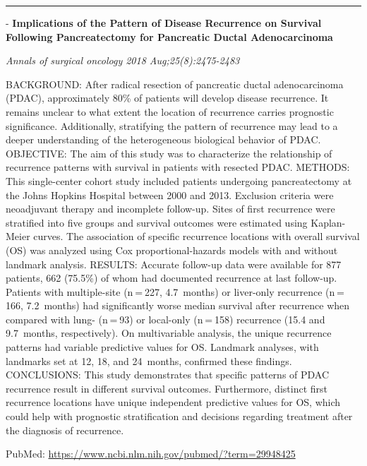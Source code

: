 \documentclass[]{article}
\begin{document}
{}

\begin{center}\rule{0.5\linewidth}{\linethickness}\end{center}

 - \textbf{Implications of the Pattern of Disease Recurrence on Survival
Following Pancreatectomy for Pancreatic Ductal Adenocarcinoma}

\emph{Annals of surgical oncology 2018 Aug;25(8):2475-2483}

BACKGROUND: After radical resection of pancreatic ductal adenocarcinoma
(PDAC), approximately 80\% of patients will develop disease recurrence.
It remains unclear to what extent the location of recurrence carries
prognostic significance. Additionally, stratifying the pattern of
recurrence may lead to a deeper understanding of the heterogeneous
biological behavior of PDAC. OBJECTIVE: The aim of this study was to
characterize the relationship of recurrence patterns with survival in
patients with resected PDAC. METHODS: This single-center cohort study
included patients undergoing pancreatectomy at the Johns Hopkins
Hospital between 2000 and 2013. Exclusion criteria were neoadjuvant
therapy and incomplete follow-up. Sites of first recurrence were
stratified into five groups and survival outcomes were estimated using
Kaplan-Meier curves. The association of specific recurrence locations
with overall survival (OS) was analyzed using Cox proportional-hazards
models with and without landmark analysis. RESULTS: Accurate follow-up
data were available for 877 patients, 662 (75.5\%) of whom had
documented recurrence at last follow-up. Patients with multiple-site
(n = 227, 4.7~months) or liver-only recurrence (n = 166, 7.2~months) had
significantly worse median survival after recurrence when compared with
lung- (n = 93) or local-only (n = 158) recurrence (15.4 and 9.7~months,
respectively). On multivariable analysis, the unique recurrence patterns
had variable predictive values for OS. Landmark analyses, with landmarks
set at 12, 18, and 24~months, confirmed these findings. CONCLUSIONS:
This study demonstrates that specific patterns of PDAC recurrence result
in different survival outcomes. Furthermore, distinct first recurrence
locations have unique independent predictive values for OS, which could
help with prognostic stratification and decisions regarding treatment
after the diagnosis of recurrence.

PubMed: \url{https://www.ncbi.nlm.nih.gov/pubmed/?term=29948425}

{}
\end{document}
